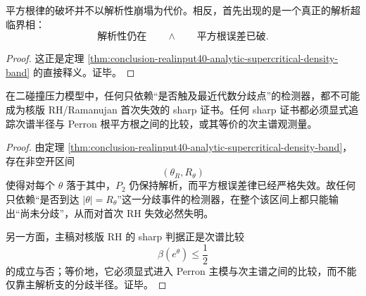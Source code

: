 \begin{corollary}\label{cor:conclusion-realinput40-analytic-supercritical-phase}
平方根律的破坏并不以解析性崩塌为代价。相反，首先出现的是一个真正的解析超临界相：
\[
\text{解析性仍在}
\qquad\wedge\qquad
\text{平方根误差已破}.
\]
\end{corollary}
\begin{proof}
这正是定理 \ref{thm:conclusion-realinput40-analytic-supercritical-density-band} 的直接释义。证毕。
\end{proof}

\begin{corollary}\label{cor:conclusion-realinput40-branch-radius-certificate-blind-to-first-rh-failure}
在二碰撞压力模型中，任何只依赖“是否触及最近代数分歧点”的检测器，都不可能成为核版 RH/Ramanujan 首次失效的 sharp 证书。任何 sharp 证书都必须显式追踪次谱半径与 Perron 根平方根之间的比较，或其等价的次主谱观测量。
\end{corollary}

\begin{proof}
由定理 \ref{thm:conclusion-realinput40-analytic-supercritical-density-band}，存在非空开区间
\[
(\theta_R,R_\theta)
\]
使得对每个 \(\theta\) 落于其中，\(P_2\) 仍保持解析，而平方根误差律已经严格失效。故任何只依赖“是否到达 \(|\theta|=R_\theta\)”这一分歧事件的检测器，在整个该区间上都只能输出“尚未分歧”，从而对首次 RH 失效必然失明。

另一方面，主稿对核版 RH 的 sharp 判据正是次谱比较
\[
\beta(e^\theta)\le \frac12
\]
的成立与否；等价地，它必须显式进入 Perron 主模与次主谱之间的比较，而不能仅靠主解析支的分歧半径。证毕。
\end{proof}

